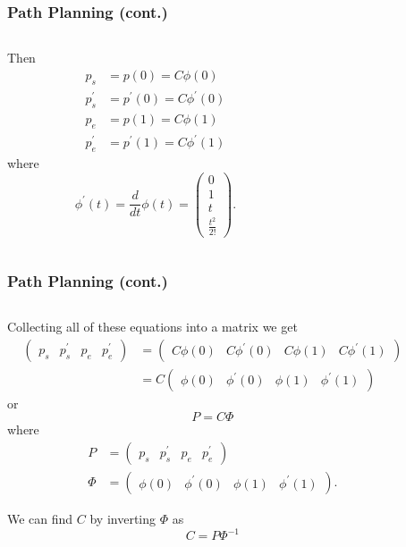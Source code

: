 \documentclass{beamer}
\begin{document}
\begin{frame}
\frametitle{Path Planning (cont.)}	
\begin{columns}
\begin{column}{0.8\textwidth}
	Then 
	\begin{align*}
	p_s &= p(0) = C \phi(0) \\
	p_s^{'} &= p^{'}(0) = C \phi^{'}(0) \\
	p_e &= p(1) = C \phi(1) \\
	p_e^{'} &= p^{'}(1) = C \phi^{'}(1)
	\end{align*}
	where
	\[
	   \phi^{'}(t) = \frac{d}{dt}\phi(t) = \begin{pmatrix} 0 \\ 1 \\  t \\ \frac{t^2}{2!} \end{pmatrix}.
	\]
	
\end{column}
\begin{column}{0.2\textwidth}  
\end{column}
\end{columns}
\end{frame}

\begin{frame}
\frametitle{Path Planning (cont.)}	
\begin{columns}
\begin{column}{0.8\textwidth}
	Collecting all of these equations into a matrix we get
	\begin{align*}
	\begin{pmatrix} p_s & p_s^{'} & p_e & p_e^{'} \end{pmatrix} &= \begin{pmatrix} C \phi(0) & C \phi^{'}(0) & C \phi(1) & C \phi^{'}(1) \end{pmatrix} \\
	&= C \begin{pmatrix} \phi(0) & \phi^{'}(0) & \phi(1) & \phi^{'}(1) \end{pmatrix}
	\end{align*}
	or
	\[
	P = C \Phi
	\]
	where
	\begin{align*}
	P &= \begin{pmatrix} p_s & p_s^{'} & p_e & p_e^{'} \end{pmatrix} \\
	\Phi &= \begin{pmatrix} \phi(0) & \phi^{'}(0) & \phi(1) & \phi^{'}(1) \end{pmatrix}.
	\end{align*}
	
	We can find $C$ by inverting $\Phi$ as
	\[
	C = P \Phi^{-1}
	\]
	
\end{column}
\begin{column}{0.2\textwidth}  
\end{column}
\end{columns}
\end{frame}
\end{document}
